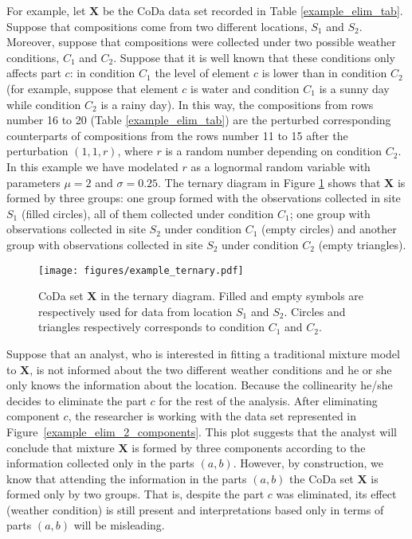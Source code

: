 \documentclass[12pt, a4paper]{article}
\begin{document}
For example, let $\mathbf{X}$ be the CoDa data set recorded in Table \ref{example_elim_tab}. Suppose that compositions come from two different locations, $S_1$ and $S_2$. Moreover, suppose that compositions were collected under two possible weather conditions, $C_1$ and $C_2$. Suppose that it is well known
that these conditions only affects part $c$: in condition $C_1$ the level of element $c$ is lower than in condition $C_2$ (for example, suppose that element $c$ is water and condition $C_1$ is a sunny day while condition $C_2$ is a rainy day). In this way, the compositions from rows number 16 to 20 (Table  
\ref{example_elim_tab}) are the perturbed corresponding counterparts of compositions from the
rows number 11 to 15 after the perturbation $(1,1,r)$, where $r$ is a random number depending on condition $C_2$. In this example we have modelated $r$ as a lognormal random variable with parameters $\mu=2$ and $\sigma=0.25$. 
The ternary diagram in Figure \ref{example_elim_component} shows that $\mathbf{X}$ is formed by three groups: one group formed with the observations collected in site $S_1$ (filled circles), all of them collected under condition $C_1$; one group with observations collected in site $S_2$ under condition $C_1$ (empty circles) and another group with observations collected in site $S_2$ under condition $C_2$ (empty triangles).

\begin{figure}[thbp]
\centering
\texttt{[image: figures/example\_ternary.pdf]}
\caption{CoDa set $\mathbf{X}$ in the ternary diagram. Filled and empty symbols are respectively used for
data from location $S_1$ and $S_2$. Circles and triangles respectively corresponds to condition
$C_1$ and $C_2$. }\label{example_elim_component}
\end{figure}
Suppose that an analyst, who is interested in fitting a traditional mixture model to $\mathbf{X}$, is not informed about the two different weather conditions and he or she only knows the information about the location. Because 
the collinearity he/she decides to eliminate the part $c$ for the rest of the analysis. After eliminating component $c$, the researcher is working with the data set represented in Figure~\ref{example_elim_2_components}. This plot suggests that the analyst will conclude that mixture $\mathbf{X}$ is formed by three components according to the information collected only in the parts $(a, b)$. However, by construction, we know that attending the information in the parts $(a, b)$ the CoDa set $\mathbf{X}$ is formed only by two groups. That is, despite the part $c$ was eliminated, its effect (weather condition) is still present and interpretations based only in terms
of parts $(a, b)$ will be misleading.
\end{document}
